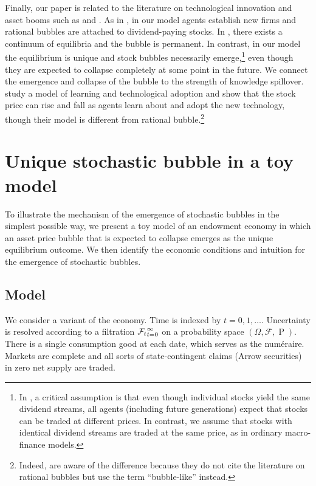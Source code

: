 \documentclass[a4paper,12pt]{article}
\newcommand{\F}{\mathcal{F}}
\renewcommand{\Pr}{\operatorname{P}}
\numberwithin{equation}{section}
\theoremstyle{plain}
\begin{document}
Finally, our paper is related to the literature on technological innovation and asset booms such as \citet{Olivier2000} and \citet{PastorVeronesi2009}. As in \citet{Olivier2000}, in our model agents establish new firms and rational bubbles are attached to dividend-paying stocks. In \citet{Olivier2000}, there exists a continuum of equilibria and the bubble is permanent. In contrast, in our model the equilibrium is unique and stock bubbles necessarily emerge,\footnote{In \citet{Olivier2000}, a critical assumption is that even though individual stocks yield the same dividend streams, all agents (including future generations) expect that stocks can be traded at different prices. In contrast, we assume that stocks with identical dividend streams are traded at the same price, as in ordinary macro-finance models.} even though they are expected to collapse completely at some point in the future. We connect the emergence and collapse of the bubble to the strength of knowledge spillover. \citet{PastorVeronesi2009} study a model of learning and technological adoption and show that the stock price can rise and fall as agents learn about and adopt the new technology, though their model is different from rational bubble.\footnote{Indeed, \citet{PastorVeronesi2009} are aware of the difference because they do not cite the literature on rational bubbles but use the term ``bubble-like'' instead.}

\section{Unique stochastic bubble in a toy model}\label{sec:toy}

To illustrate the mechanism of the emergence of stochastic bubbles in the simplest possible way, we present a toy model of an endowment economy in which an asset price bubble that is expected to collapse emerges as the unique equilibrium outcome. We then identify the economic conditions and intuition for the emergence of stochastic bubbles.  

\subsection{Model}\label{subsec:toy_model}

We consider a variant of the \citet{Lucas1978} economy. Time is indexed by $t=0,1,\dotsc$. Uncertainty is resolved according to a filtration $\set{\F_t}_{t=0}^\infty$ on a probability space $(\Omega,\F,\Pr)$. There is a single consumption good at each date, which serves as the num\'eraire. Markets are complete and all sorts of state-contingent claims (Arrow securities) in zero net supply are traded.
\end{document}
